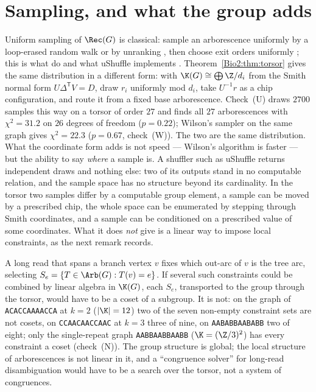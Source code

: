\section{Sampling, and what the group adds}\label{Bio2:sec:sampling}

Uniform sampling of $\Rec(G)$ is classical: sample an arborescence uniformly by a
loop-erased random walk \cite{Wilson,PW} or by unranking \cite{CMN}, then choose exit
orders uniformly \cite{CC}; this is what \cite{AE,KMUW} do and what uShuffle implements
\cite{uShuffle}. Theorem~\ref{Bio2:thm:torsor} gives the same distribution in a different form:
with $\K(G)\cong\bigoplus\Z/d_i$ from the Smith normal form $U\Delta^{\mathsf T}V=D$, draw
$r_i$ uniformly mod $d_i$, take $U^{-1}r$ as a chip configuration, and route it from a
fixed base arborescence. Check~(U) draws $2700$ samples this way on a torsor of order $27$
and finds all $27$ arborescences with $\chi^{2}=31.2$ on $26$ degrees of freedom
($p=0.22$); Wilson's sampler on the same graph gives $\chi^{2}=22.3$ ($p=0.67$,
check~(W)). The two are the same
distribution. What the coordinate form adds is not speed --- Wilson's algorithm is faster
--- but the ability to say \emph{where} a sample is. A shuffler such as uShuffle returns
independent draws and nothing else: two of its outputs stand in no computable relation,
and the sample space has no structure beyond its cardinality. In the torsor two samples
differ by a computable group element, a sample can be moved by a prescribed chip, the
whole space can be enumerated by stepping through Smith coordinates, and a sample can be
conditioned on a prescribed value of some coordinates. What it does \emph{not} give is a
linear way to impose local constraints, as the next remark records.

\begin{remark}\label{Bio2:rem:cosets}
A long read that spans a branch vertex $v$ fixes which out-arc of $v$ is the tree arc,
selecting $S_{e}=\{T\in\Arb(G):T(v)=e\}$. If several such constraints could be combined
by linear algebra in $\K(G)$, each $S_e$, transported to the group through the torsor,
would have to be a coset of a subgroup. It is not: on the graph of \texttt{ACACCAAAACCA}
at $k=2$ ($|\K|=12$) two of the seven non-empty constraint sets are not cosets, on
\texttt{CCAACAACCAAC} at $k=3$ three of nine, on \texttt{AABABBAABABB} two of eight;
only the single-repeat graph \texttt{AABBAABBAABB} ($\K=(\Z/3)^{2}$) has every
constraint a coset (check~(N)). The group structure is global; the local structure of
arborescences is not linear in it, and a ``congruence solver'' for long-read
disambiguation would have to be a search over the torsor, not a system of congruences.
\end{remark}

